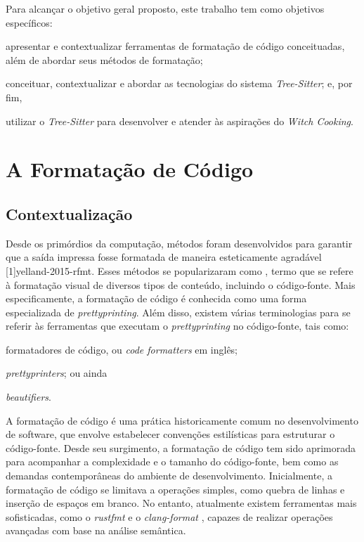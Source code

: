 \documentclass[11pt, a4paper, english, openright, twoside, brazil]{abntex2}
\begin{document}
  Para alcançar o objetivo geral proposto, este trabalho tem como objetivos
  específicos:
  \begin{inparaenum}
    \item apresentar e contextualizar ferramentas de formatação de código
          conceituadas, além de abordar seus métodos de formatação;
    \item conceituar, contextualizar e abordar as tecnologias do sistema
          \textit{Tree-Sitter}; e, por fim,
    \item utilizar o \textit{Tree-Sitter} para desenvolver e atender às
          aspirações do \textit{Witch Cooking}.
  \end{inparaenum}


  \chapter{A Formatação de Código}

  \section{Contextualização}

  Desde os primórdios da computação, métodos foram desenvolvidos para garantir
  que a saída impressa fosse formatada de maneira esteticamente agradável
  [1]{yelland-2015-rfmt}. Esses métodos se
  popularizaram como \textit{}, termo que se refere à
  formatação visual de diversos tipos de conteúdo, incluindo o código-fonte.
  Mais especificamente, a formatação de código é conhecida como uma forma
  especializada de \textit{prettyprinting}. Além disso, existem várias
  terminologias para se referir às ferramentas que executam o
  \textit{prettyprinting} no código-fonte, tais como:
  \begin{inparaenum}
    \item formatadores de código, ou \textit{code formatters} em inglês;
    \item \textit{prettyprinters}; ou ainda
    \item \textit{beautifiers}.
  \end{inparaenum}

  A formatação de código é uma prática historicamente comum no desenvolvimento
  de software, que envolve estabelecer convenções estilísticas para estruturar
  o código-fonte. Desde seu surgimento, a formatação de código tem sido
  aprimorada para acompanhar a complexidade e o tamanho do código-fonte, bem
  como as demandas contemporâneas do ambiente de desenvolvimento. Inicialmente,
  a formatação de código se limitava a operações simples, como quebra de linhas
  e inserção de espaços em branco. No entanto, atualmente existem ferramentas
  mais sofisticadas, como o \textit{rustfmt} \cite{rust-lang-2023-rustfmt} e o
  \textit{clang-format} \cite{llvm-2023-clang}, capazes de realizar operações
  avançadas com base na análise semântica.
\end{document}
